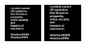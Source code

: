 \documentclass{acm_proc_article-sp}
\newcommand{\thumbheight}{16mm}
\newenvironment{thumbsequence}{}{\makebox[4mm]{}}
\begin{document}
\begin{figure}
\begin{centering}
\begin{thumbsequence}
		\includegraphics[height=\thumbheight]{resources/sopa/looseduplicate3.jpg}
		\includegraphics[height=\thumbheight]{resources/sopa/looseduplicate4.jpg}

\end{thumbsequence}
\end{centering}
\end{figure}
\end{document}
